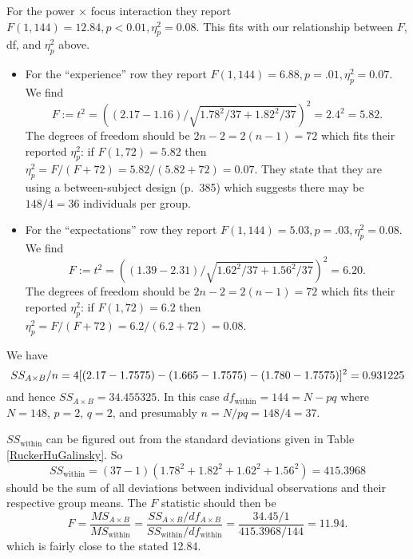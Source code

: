 For the power $\times$ focus interaction they report $F(1,144)=12.84, p<0.01, \eta_p^2=0.08$. This fits with our relationship between $F$, df, and $\eta_p^2$ above.
\begin{itemize}
\item For the ``experience'' row they report $F(1,144)=6.88, p=.01, \eta_p^2=0.07$.
We find
\[
	F:= t^2= \left((2.17-1.16)/\sqrt{1.78^2/37+1.82^2/37}\right)^2=2.4^2=5.82.
\]
The degrees of freedom should be $2n-2=2(n-1)=72$ which fits their reported $\eta_p^2$:
if $F(1,72)=5.82$ then $\eta^2_p=F/(F+72)=5.82/(5.82+72)=0.07$.
They state that they are using a between-subject design (p.~385) which suggests there may be $148/4=36$ individuals per group.
\item For the ``expectations'' row they report $F(1,144)=5.03, p=.03, \eta_p^2=0.08$.
We find
\[
	F:=t^2=\left((1.39-2.31)/\sqrt{1.62^2/37+1.56^2/37}\right)^2=6.20.
\]
The degrees of freedom should be $2n-2=2(n-1)=72$ which fits their reported $\eta_p^2$:
if $F(1,72)=6.2$ then $\eta^2_p=F/(F+72)=6.2/(6.2+72)=0.08$.
\end{itemize}
We have
\[
SS_{A\times B}/n=	4   [(2.17-1.7575)-(1.665-1.7575)-(1.780-1.7575)]^2\\
	=0.931225
\]
and hence $SS_{A\times B} = 34.455325$.
In this case $df_{\text{within}}=144=N-pq$ where $N=148$, $p=2$, $q=2$, and presumably $n=N/pq=148/4=37$.

$SS_{\text{within}}$ can be figured out from the standard deviations given in Table \ref{RuckerHuGalinsky}.
So
\[
	SS_{\text{within}}=(37-1)(1.78^2+1.82^2+1.62^2+1.56^2)=415.3968
\]
should be the sum of all deviations between individual observations and their respective group means.
The $F$ statistic should then be
\[
F=\frac{MS_{A\times B}}{MS_{\text{within}}}=\frac{SS_{A\times B}/df_{A\times B}}{SS_{\text{within}}/df_{\text{within}}}=\frac{34.45/1}{415.3968/144}=11.94.
\]
which is fairly close to the stated 12.84.

